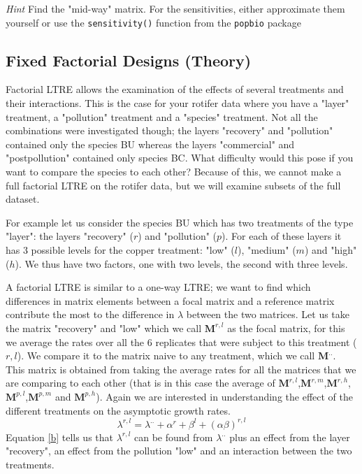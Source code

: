 \documentclass{article}\usepackage[]{graphicx}\usepackage[]{color}
\begin{document}
\textit{Hint} Find the "mid-way" matrix. For the sensitivities, either approximate them yourself or use the \texttt{sensitivity()} function from the \texttt{popbio} package

\subsection{Fixed Factorial Designs (Theory)}
Factorial LTRE allows the examination of the effects of several treatments and their interactions. This is the case for your rotifer data where you have a "layer" treatment, a "pollution" treatment and a "species" treatment. Not all the combinations were investigated though; the layers "recovery" and "pollution" contained only the species BU whereas the layers "commercial" and "postpollution" contained only species BC. What difficulty would this pose if you want to compare the species to each other? Because of this, we cannot make a full factorial LTRE on the rotifer data, but we will examine subsets of the full dataset.


For example let us consider the species BU which has two treatments of the type "layer": the layers "recovery" ($r$) and "pollution" ($p$). For each of these layers it has 3 possible levels for the copper treatment: "low" ($l$), "medium" ($m$) and "high" ($h$). We thus have two factors, one with two levels, the second with three levels.

A factorial LTRE is similar to a one-way LTRE; we want to find which differences in matrix elements between a focal matrix and a reference matrix contribute the most to the difference in $\lambda$ between the two matrices. Let us take the matrix "recovery" and "low" which we call $\boldsymbol{M}^{r,l}$ as the focal matrix, for this we average the rates over all the $6$ replicates that were subject to this treatment ($r,l$). We compare it to the matrix naive to any treatment, which we call $\boldsymbol{M}^{..}$. This matrix is obtained from taking the average rates for all the matrices that we are comparing to each other (that is in this case the average of $\boldsymbol{M}^{r,l}$,$\boldsymbol{M}^{r,m}$,$\boldsymbol{M}^{r,h}$,$\boldsymbol{M}^{p,l}$,$\boldsymbol{M}^{p,m}$ and $\boldsymbol{M}^{p,h}$). Again we are interested in understanding the effect of the different treatments on the asymptotic growth rates.
\begin{equation}\label{b}
\lambda^{r,l}=\lambda^{..}+\alpha^{r}+\beta^{l}+(\alpha \beta)^{r,l}
\end{equation}
Equation \ref{b} tells us that $\lambda^{r,l}$ can be found from $\lambda^{..}$ plus an effect from the layer "recovery", an effect from the pollution "low" and an interaction between the two treatments.
\end{document}
